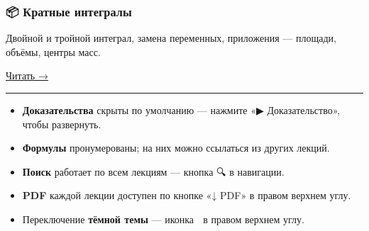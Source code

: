 \documentclass[
  russian,
  12pt,
  a4paper,
]{article}
\providecommand{\tightlist}{%
  \setlength{\itemsep}{0pt}\setlength{\parskip}{0pt}}
\theoremstyle{definition}
\theoremstyle{remark}
\begin{document}
\subsubsection{📦 Кратные
интегралы}\label{ux43aux440ux430ux442ux43dux44bux435-ux438ux43dux442ux435ux433ux440ux430ux43bux44b}

Двойной и тройной интеграл, замена переменных, приложения --- площади,
объёмы, центры масс.

\href{lectures/04-multiple-integrals.qmd}{Читать →}

\begin{center}\rule{0.5\linewidth}{0.5pt}\end{center}

\begin{tcolorbox}[enhanced jigsaw, arc=.35mm, bottomrule=.15mm, bottomtitle=1mm, breakable, colback=white, colbacktitle=quarto-callout-tip-color!10!white, colframe=quarto-callout-tip-color-frame, coltitle=black, left=2mm, leftrule=.75mm, opacityback=0, opacitybacktitle=0.6, rightrule=.15mm, title=\textcolor{quarto-callout-tip-color}{\faLightbulb}\hspace{0.5em}{Как пользоваться сайтом}, titlerule=0mm, toprule=.15mm, toptitle=1mm]

\begin{itemize}
\tightlist
\item
  \textbf{Доказательства} скрыты по умолчанию --- нажмите «▶
  Доказательство», чтобы развернуть.
\item
  \textbf{Формулы} пронумерованы; на них можно ссылаться из других
  лекций.
\item
  \textbf{Поиск} работает по всем лекциям --- кнопка 🔍 в навигации.
\item
  \textbf{PDF} каждой лекции доступен по кнопке «↓ PDF» в правом верхнем
  углу.
\item
  Переключение \textbf{тёмной темы} --- иконка 🌙 в правом верхнем углу.
\end{itemize}

\end{tcolorbox}
\end{document}
